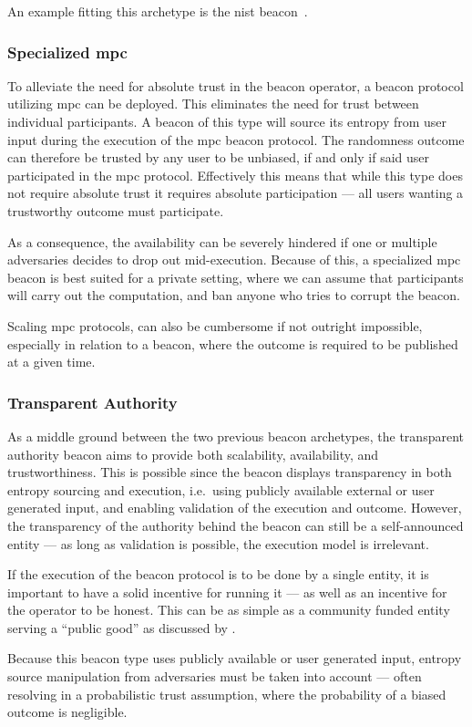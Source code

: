 An example fitting this archetype is the \gls{nist} beacon~\cite{nistbeacon}.

\subsubsection{Specialized \gls{mpc}}\label{ssub:specialized_mpc}
To alleviate the need for absolute trust in the beacon operator, a beacon protocol utilizing \acrfull{mpc} can be deployed.
This eliminates the need for trust between individual participants.
A beacon of this type will source its entropy from user input during the execution of the \gls{mpc} beacon protocol.
The randomness outcome can therefore be trusted by any user to be unbiased, if and only if said user participated in the \gls{mpc} protocol.
Effectively this means that while this type does not require absolute trust it requires absolute participation --- all users wanting a trustworthy outcome must participate.

As a consequence, the availability can be severely hindered if one or multiple adversaries decides to drop out mid-execution.
Because of this, a specialized \gls{mpc} beacon is best suited for a private setting, where we can assume that participants will carry out the computation, and ban anyone who tries to corrupt the beacon.

Scaling \gls{mpc} protocols, can also be cumbersome if not outright impossible, especially in relation to a beacon, where the outcome is required to be published at a given time.

\subsubsection{Transparent Authority}\label{ssub:transparent_authority}
As a middle ground between the two previous beacon archetypes, the transparent authority beacon aims to provide both scalability, availability, and trustworthiness.
This is possible since the beacon displays transparency in both entropy sourcing and execution, i.e.\ using publicly available external or user generated input, and enabling validation of the execution and outcome.
However, the transparency of the authority behind the beacon can still be a self-announced entity --- as long as validation is possible, the execution model is irrelevant.

If the execution of the beacon protocol is to be done by a single entity, it is important to have a solid incentive for running it --- as well as an incentive for the operator to be honest.
This can be as simple as a community funded entity serving a \enquote{public good} as discussed by \citet{bunz2017proofsof}.

Because this beacon type uses publicly available or user generated input, entropy source manipulation from adversaries must be taken into account --- often resolving in a probabilistic trust assumption, where the probability of a biased outcome is negligible.
